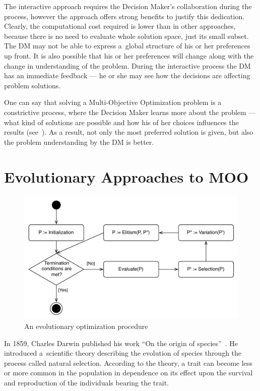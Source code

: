 The interactive approach requires the Decision Maker's collaboration during
the process, however the approach offers strong benefits to justify this
dedication. Clearly, the computational cost required is lower than in other
approaches, because there is no need to evaluate whole solution space, just
its small subset. The DM may not be able to express a~global structure of his
or her preferences up front. It is also possible that his or her preferences
will change along with the change in understanding of the problem. During the
interactive process the DM has an immediate feedback --- he or she may see how
the decisions are affecting problem solutions.

One can say that solving a Multi-Objective Optimization problem is a
constrictive process, where the Decision Maker learns more about the problem
--- what kind of solutions are possible and how his of her choices influences
the results (see~\cite{MRW08}). As a result, not only the most preferred
solution is given, but also the problem understanding by the DM is better.


\section{Evolutionary Approaches to MOO}
\label{sec_ea_in_moo}

\begin{figure}
  \centering \includegraphics[scale=0.65]{img/eo}
  \caption{An evolutionary optimization procedure}
  \label{eo}
\end{figure}

In 1859, Charles Darwin published his work ``On the origin of
species''~\cite{Dar1859}. He introduced a~scientific theory describing the
evolution of species through the process called natural selection.  According
to the theory, a trait can become less or more common in the population in
dependence on its effect upon the survival and reproduction of the individuals
bearing the trait.

